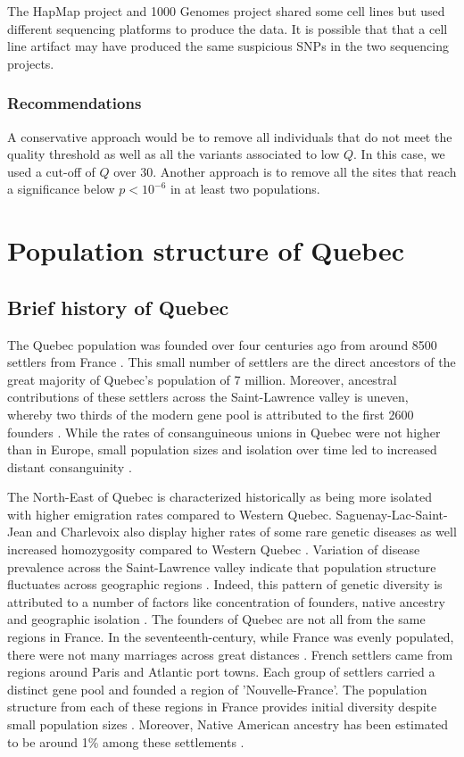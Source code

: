 \documentclass[
11pt, %
oneside, %
english, %
doublespacing, %
headsepline, %
chapterinoneline, %
]{MastersDoctoralThesis} %
\begin{document}
The HapMap project and 1000 Genomes project shared some cell lines but used different sequencing platforms to produce the data.
It is possible that that a cell line artifact may have produced the same suspicious SNPs in the two sequencing projects.

\subsection{Recommendations}
A conservative approach would be to remove all individuals that do not meet the quality threshold as well as all the variants associated to low $Q$.
In this case, we used a cut-off of $Q$ over 30.
Another approach is to remove all the sites that reach a significance below $ p < 10^{-6}$ in at least two populations.
\vfill
\chapter{Population structure of Quebec}

\section{Brief history of Quebec}
The Quebec population was founded over four centuries ago from around 8500 settlers from France \citep{Bherer2011,Laberge2005}.
This small number of settlers are the direct ancestors of the great majority of Quebec's population of 7 million.
Moreover, ancestral contributions of these settlers across the Saint-Lawrence valley is uneven, whereby two thirds of the modern gene pool is attributed to the first 2600 founders \citep{Gagnon2001, Laberge2005}.
While the rates of consanguineous unions in Quebec were not higher than in Europe, small population sizes and isolation over time led to increased distant consanguinity \citep{Laberge2005}.

The North-East of Quebec is characterized historically as being more isolated with higher emigration rates compared to Western Quebec.
Saguenay-Lac-Saint-Jean and Charlevoix also display higher rates of some rare genetic diseases as well increased homozygosity compared to Western Quebec \citep{Gagnon2001}.
Variation of disease prevalence across the Saint-Lawrence valley indicate that population structure fluctuates across geographic regions \citep{Gagnon2001}.
Indeed, this pattern of genetic diversity is attributed to a number of factors like concentration of founders, native ancestry and geographic isolation \citep{Gagnon2001,Laberge2005,Bherer2011}.
The founders of Quebec are not all from the same regions in France.
In the seventeenth-century, while France was evenly populated, there were not many marriages across great distances \citep{Laberge2005}.
French settlers came from regions around Paris and Atlantic port towns.
Each group of settlers carried a distinct gene pool and founded a region of 'Nouvelle-France'.
The population structure from each of these regions in France provides initial diversity despite small population sizes \citep{Laberge2005}.
Moreover, Native American ancestry has been estimated to be around 1\% among these settlements \citep{Moreau2013}.
\end{document}
